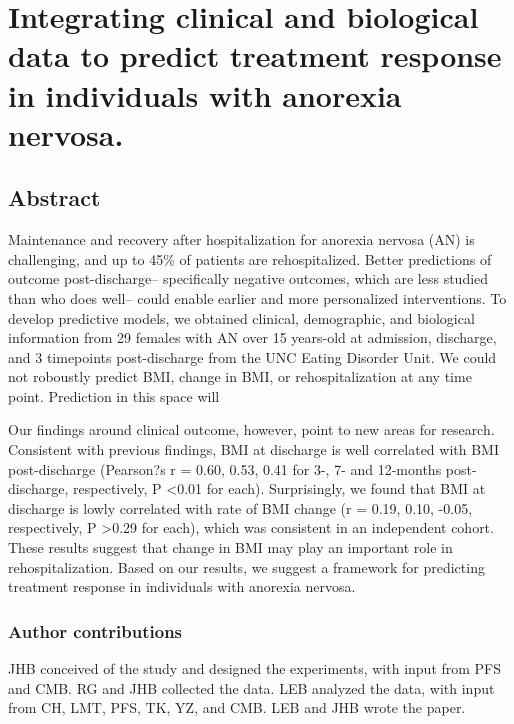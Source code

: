 \chapter{Integrating clinical and biological data to predict treatment response in individuals with anorexia nervosa.}\label{ch:singleCellSeq}

\section[Abstract]{Abstract\footnotemark}

Maintenance and recovery after hospitalization for anorexia nervosa (AN) is challenging, and up to 45\% of patients are rehospitalized. Better predictions of outcome post-discharge-- specifically negative outcomes, which are less studied than who does well-- could enable earlier and more personalized interventions. To develop predictive models, we obtained clinical, demographic, and biological information from 29 females with AN over 15 years-old at admission, discharge, and 3 timepoints post-discharge from the UNC Eating Disorder Unit. We could not roboustly predict BMI, change in BMI, or rehospitalization at any time point. Prediction in this space will

Our findings around clinical outcome, however, point to new areas for research. Consistent with previous findings, BMI at discharge is well correlated with BMI post-discharge (Pearson?s r = 0.60, 0.53, 0.41 for 3-, 7- and 12-months post-discharge, respectively, P \textless 0.01 for each). Surprisingly, we found that BMI at discharge is lowly correlated with rate of BMI change (r = 0.19, 0.10, -0.05, respectively, P \textgreater 0.29 for each), which was consistent in an independent cohort. These results suggest that change in BMI may play an important role in rehospitalization. Based on our results, we suggest a framework for predicting treatment response in individuals with anorexia nervosa.




\subsection{Author contributions}

JHB conceived of the study and designed the experiments, with input from PFS and CMB. RG and JHB collected the data. LEB analyzed the data, with input from CH, LMT, PFS, TK, YZ, and CMB. LEB and JHB wrote the paper. 

